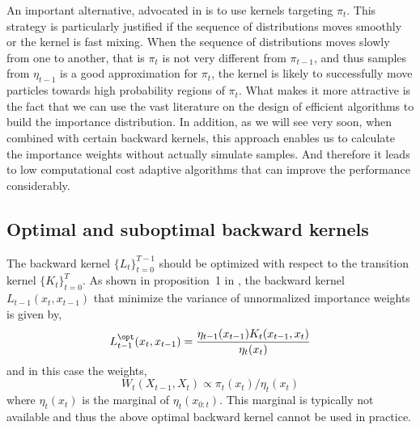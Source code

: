 An important alternative, advocated in \cite{DelMoral:2006hc} is to use \mcmc
kernels targeting $\pi_t$. This strategy is particularly justified if the
sequence of distributions moves smoothly or the kernel is fast mixing. When the
sequence of distributions moves slowly from one to another, that is $\pi_t$
is not very different from $\pi_{t-1}$, and thus samples from $\eta_{t-1}$ is
a good approximation for $\pi_t$, the kernel is likely to successfully move
particles towards high probability regions of $\pi_t$. What makes it more
attractive is the fact that we can use the vast literature on the design of
efficient \mcmc algorithms to build the importance distribution. In addition,
as we will see very soon, when combined with certain backward kernels, this
approach enables us to calculate the importance weights without actually
simulate samples. And therefore it leads to low computational cost adaptive
algorithms that can improve the performance considerably.

\subsection{Optimal and suboptimal backward kernels}
\label{sub:Optimal and suboptimal backward kernels}

The backward kernel $\{L_t\}_{t=0}^{T-1}$ should be optimized with respect to
the transition kernel $\{K_t\}_{t=0}^T$. As shown in proposition~1{} in
\cite{DelMoral:2006hc}, the backward kernel $L_{t-1}(x_t, x_{t-1})$ that
minimize the variance of unnormalized importance weights is given by,
\begin{equation}
  L_{t-1}^{\opt}(x_t,x_{t-1}) =
  \frac{\eta_{t-1}(x_{t-1})K_t(x_{t-1},x_t)}{\eta_t(x_t)}
\end{equation}
and in this case the weights,
\begin{equation}
  W_t(X_{t-1},X_t) \propto \pi_t(x_t)/\eta_t(x_t)
\end{equation}
where $\eta_t(x_t)$ is the marginal of $\eta_t(x_{0:t})$. This marginal is
typically not available and thus the above optimal backward kernel cannot be
used in practice.


